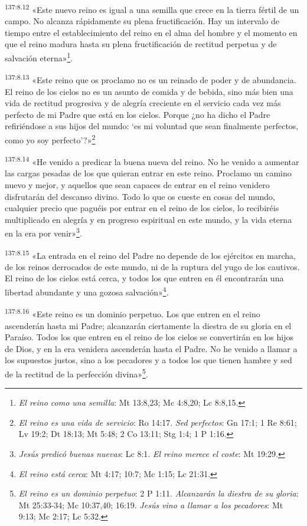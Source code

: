 \par
\textsuperscript{137:8.12} «Este nuevo reino es igual a una semilla que crece en la tierra fértil de un campo. No alcanza rápidamente su plena fructificación. Hay un intervalo de tiempo entre el establecimiento del reino en el alma del hombre y el momento en que el reino madura hasta su plena fructificación de rectitud perpetua y de salvación eterna»\footnote{\textit{El reino como una semilla}: Mt 13:8,23; Mc 4:8,20; Lc 8:8,15.}.

\par
\textsuperscript{137:8.13} «Este reino que os proclamo no es un reinado de poder y de abundancia. El reino de los cielos no es un asunto de comida y de bebida, sino más bien una vida de rectitud progresiva y de alegría creciente en el servicio cada vez más perfecto de mi Padre que está en los cielos. Porque ¿no ha dicho el Padre refiriéndose a sus hijos del mundo: `es mi voluntad que sean finalmente perfectos, como yo soy perfecto'?»\footnote{\textit{El reino es una vida de servicio}: Ro 14:17. \textit{Sed perfectos}: Gn 17:1; 1 Re 8:61; Lv 19:2; Dt 18:13; Mt 5:48; 2 Co 13:11; Stg 1:4; 1 P 1:16.}

\par
\textsuperscript{137:8.14} «He venido a predicar la buena nueva del reino. No he venido a aumentar las cargas pesadas de los que quieran entrar en este reino. Proclamo un camino nuevo y mejor, y aquellos que sean capaces de entrar en el reino venidero disfrutarán del descanso divino. Todo lo que os cueste en cosas del mundo, cualquier precio que paguéis por entrar en el reino de los cielos, lo recibiréis multiplicado en alegría y en progreso espiritual en este mundo, y la vida eterna en la era por venir»\footnote{\textit{Jesús predicó buenas nuevas}: Lc 8:1. \textit{El reino merece el coste}: Mt 19:29.}.

\par
\textsuperscript{137:8.15} «La entrada en el reino del Padre no depende de los ejércitos en marcha, de los reinos derrocados de este mundo, ni de la ruptura del yugo de los cautivos. El reino de los cielos está cerca, y todos los que entren en él encontrarán una libertad abundante y una gozosa salvación»\footnote{\textit{El reino está cerca}: Mt 4:17; 10:7; Mc 1:15; Lc 21:31.}.

\par
\textsuperscript{137:8.16} «Este reino es un dominio perpetuo. Los que entren en el reino ascenderán hasta mi Padre; alcanzarán ciertamente la diestra de su gloria en el Paraíso. Todos los que entren en el reino de los cielos se convertirán en los hijos de Dios, y en la era venidera ascenderán hasta el Padre. No he venido a llamar a los supuestos justos, sino a los pecadores y a todos los que tienen hambre y sed de la rectitud de la perfección divina»\footnote{\textit{El reino es un dominio perpetuo}: 2 P 1:11. \textit{Alcanzarán la diestra de su gloria}: Mt 25:33-34; Mc 10:37,40; 16:19. \textit{Jesús vino a llamar a los pecadores}: Mt 9:13; Mc 2:17; Lc 5:32.}.

